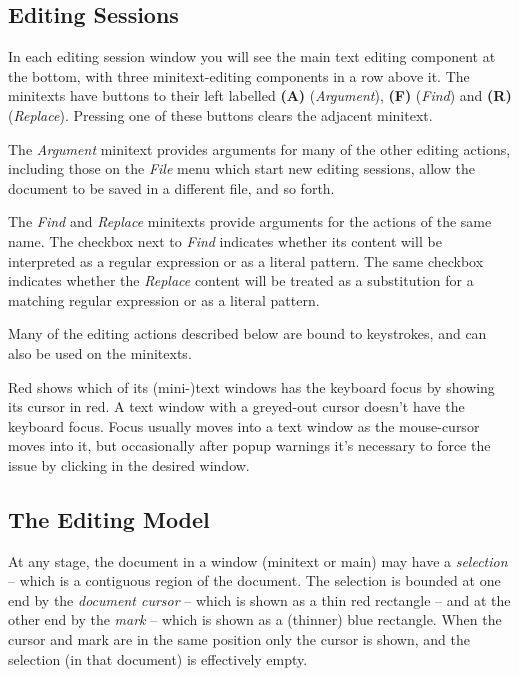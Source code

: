 \documentclass[
]{article}
\begin{document}
\hypertarget{editing-sessions}{%
\subsection{Editing Sessions}\label{editing-sessions}}

In each editing session window you will see the main text editing
component at the bottom, with three minitext-editing components in a row
above it. The minitexts have buttons to their left labelled \textbf{(A)}
(\emph{Argument}), \textbf{(F)} (\emph{Find}) and \textbf{(R)}
(\emph{Replace}). Pressing one of these buttons clears the adjacent
minitext.

The \emph{Argument} minitext provides arguments for many of the other
editing actions, including those on the \emph{File} menu which start new
editing sessions, allow the document to be saved in a different file,
and so forth.

The \emph{Find} and \emph{Replace} minitexts provide arguments for the
actions of the same name. The checkbox next to \emph{Find} indicates
whether its content will be interpreted as a regular expression or as a
literal pattern. The same checkbox indicates whether the \emph{Replace}
content will be treated as a substitution for a matching regular
expression or as a literal pattern.

Many of the editing actions described below are bound to keystrokes, and
can also be used on the minitexts.

Red shows which of its (mini-)text windows has the keyboard focus by
showing its cursor in red. A text window with a greyed-out cursor
doesn't have the keyboard focus. Focus usually moves into a text window
as the mouse-cursor moves into it, but occasionally after popup warnings
it's necessary to force the issue by clicking in the desired window.

\hypertarget{the-editing-model}{%
\subsection{The Editing Model}\label{the-editing-model}}

At any stage, the document in a window (minitext or main) may have a
\emph{selection} -- which is a contiguous region of the document. The
selection is bounded at one end by the \emph{document cursor} -- which
is shown as a thin red rectangle -- and at the other end by the
\emph{mark} -- which is shown as a (thinner) blue rectangle. When the
cursor and mark are in the same position only the cursor is shown, and
the selection (in that document) is effectively empty.
\end{document}
